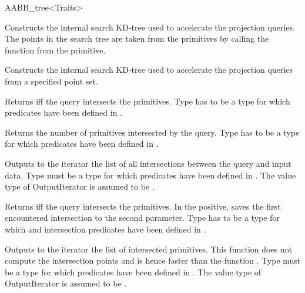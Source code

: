 \begin{ccRefClass}{AABB_tree<Traits>}
\ccOperations

{ Constructs the internal search KD-tree used to accelerate the projection queries. The points in the search tree are taken from the primitives by calling the function  from the primitive.}

{ Constructs the internal search KD-tree used to accelerate the projection queries from a specified point set. }


{ Returns  iff the query intersects the primitives. Type  has to be a type for which  predicates have been defined in .}
	
{Returns the number of primitives intersected by the query. Type  has to be a type for which  predicates have been defined in .}
	
{Outputs to the iterator the list of all intersections between the query and input data. Type  must be a type for which  predicates have been defined in . The value type of OutputIterator is assumed to be .}

{Returns  iff the query intersects the primitives. In the positive, saves the first encountered intersection to the second parameter. Type  has to be a type for which  and intersection predicates have been defined in .}

{Outputs to the iterator the list of intersected primitives. This function does not compute the intersection points and is hence faster than the function . Type  must be a type for which  predicates have been defined in . The value type of OutputIterator is assumed to be .}


\end{ccRefClass}
